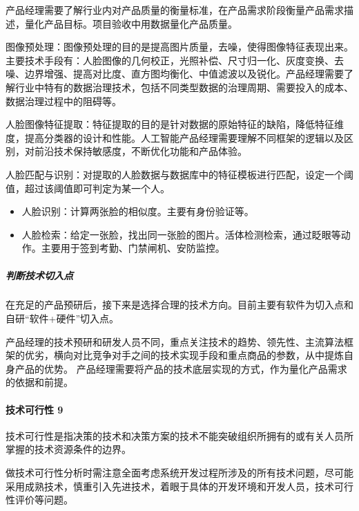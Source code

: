 \documentclass[letterpaper,11pt,english]{sphinxmanual}
\begin{document}
产品经理需要了解行业内对产品质量的衡量标准，在产品需求阶段衡量产品需求描述，量化产品目标。项目验收中用数据量化产品质量。

图像预处理：图像预处理的目的是提高图片质量，去噪，使得图像特征表现出来。主要技术手段有：人脸图像的几何校正，光照补偿、尺寸归一化、灰度变换、去噪、边界增强、提高对比度、直方图均衡化、中值滤波以及锐化。产品经理需要了解行业中特有的数据治理技术，包括不同类型数据的治理周期、需要投入的成本、数据治理过程中的阻碍等。

人脸图像特征提取：特征提取的目的是针对数据的原始特征的缺陷，降低特征维度，提高分类器的设计和性能。人工智能产品经理需要理解不同框架的逻辑以及区别，对前沿技术保持敏感度，不断优化功能和产品体验。

人脸匹配与识别：对提取的人脸数据与数据库中的特征模板进行匹配，设定一个阈值，超过该阈值即可判定为某一个人。
\begin{itemize}
\item {} 
人脸识别：计算两张脸的相似度。主要有身份验证等。

\item {} 
人脸检索：给定一张脸，找出同一张脸的图片。活体检测检索，通过眨眼等动作。主要用于签到考勤、门禁闸机、安防监控。

\end{itemize}


\subparagraph{判断技术切入点}
\label{\detokenize{chapter_idea/understand_tech:id37}}
在充足的产品预研后，接下来是选择合理的技术方向。目前主要有软件为切入点和自研“软件+硬件”切入点。

产品经理的技术预研和研发人员不同，重点关注技术的趋势、领先性、主流算法框架的优劣，横向对比竞争对手之间的技术实现手段和重点商品的参数，从中提炼自身产品的优势。
产品经理需要将产品的技术底层实现的方式，作为量化产品需求的依据和前提。


\paragraph{技术可行性 9\sphinxfootnotemark[379]}
\label{\detokenize{chapter_idea/understand_tech:id38}}%
\begin{footnotetext}[379]\sphinxAtStartFootnote
{}
%
\end{footnotetext}\ignorespaces 
技术可行性是指决策的技术和决策方案的技术不能突破组织所拥有的或有关人员所掌握的技术资源条件的边界。

做技术可行性分析时需注意全面考虑系统开发过程所涉及的所有技术问题，尽可能采用成熟技术，慎重引入先进技术，着眼于具体的开发环境和开发人员，技术可行性评价等问题。
\end{document}
